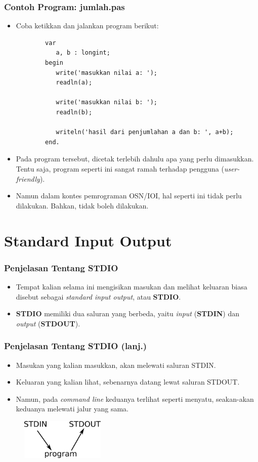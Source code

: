 \documentclass{beamer}
\begin{document}
\begin{frame}[fragile]
\frametitle{Contoh Program: jumlah.pas}
\begin{itemize}
	\item Coba ketikkan dan jalankan program berikut:
	\begin{lstlisting}
		var
		   a, b : longint;
		begin
		   write('masukkan nilai a: ');
		   readln(a);

		   write('masukkan nilai b: ');
		   readln(b);
		   
		   writeln('hasil dari penjumlahan a dan b: ', a+b);
		end.
	\end{lstlisting}
	\item Pada program tersebut, dicetak terlebih dahulu apa yang perlu dimasukkan. Tentu saja, program seperti ini sangat ramah terhadap pengguna (\textit{user-friendly}).
	\item Namun dalam kontes pemrograman OSN/IOI, hal seperti \newline ini tidak perlu dilakukan. Bahkan, tidak boleh dilakukan.
\end{itemize}
\end{frame}

\section{Standard Input Output}
\frame{\sectionpage}

\begin{frame}
\frametitle{Penjelasan Tentang STDIO}
\begin{itemize}
	\item Tempat kalian selama ini mengisikan masukan dan melihat keluaran biasa disebut sebagai \textit{standard input output}, atau \textbf{STDIO}.
	\item \textbf{STDIO} memiliki dua saluran yang berbeda, yaitu \textit{input} (\textbf{STDIN}) dan \textit{output} (\textbf{STDOUT}).
\end{itemize}
\end{frame}

\begin{frame}
\frametitle{Penjelasan Tentang STDIO (lanj.)}
\begin{itemize}
	\item Masukan yang kalian masukkan, akan melewati saluran STDIN.
	\item Keluaran yang kalian lihat, sebenarnya datang lewat saluran STDOUT.
	\item Namun, pada \textit{command line} keduanya terlihat seperti menyatu, seakan-akan keduanya melewati jalur yang sama.
\end{itemize}
\begin{figure}
	\includegraphics[width=4cm]{asset/g1.png}
\end{figure}
\end{frame}
\end{document}
